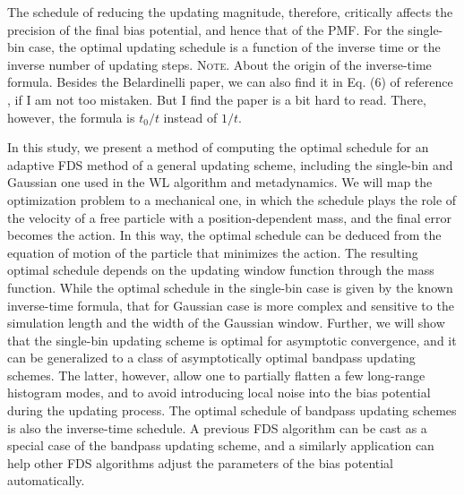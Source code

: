 \documentclass[reprint, superscriptaddress, floatfix]{revtex4-1}
\newcommand{\note}[1]{{\color{DarkGreen}\footnotesize \textsc{Note.} #1}}
\begin{document}
The schedule of reducing
the updating magnitude,
therefore, critically affects
the precision of the final bias potential,
and hence that of the PMF\cite{laio2005, bussi2006, poulain2006,
belardinelli2007, *belardinelli2007jcp, *belardinelli2008, *belardinelli2016,
liang2007, min2007,
morozov2007, zhou2008,
komura2012, *caparica2012, *caparica2014,
barducci2008, dickson2011, dama2014}.
%
For the single-bin case, the optimal updating schedule
is a function of the
inverse time\cite{
belardinelli2007, *belardinelli2007jcp, *belardinelli2008, *belardinelli2016,
liang2007,
morozov2007, zhou2008}
or
the inverse number of updating steps.
\note{
  About the origin of the inverse-time formula.
  Besides the Belardinelli paper,
  we can also find it in Eq. (6) of reference \cite{liang2007},
  if I am not too mistaken.
  But I find the paper is a bit hard to read.
  There, however, the formula is $t_0/t$ instead of $1/t$.
}
%


In this study,
we present a method of computing
the optimal schedule
for an adaptive FDS method
of a general updating scheme,
including the single-bin and Gaussian one
used in the WL algorithm and metadynamics.
%
We will map the optimization problem to a mechanical one,
in which the schedule plays the role of the velocity of
a free particle with a position-dependent mass,
and the final error becomes the action.
%
In this way, the optimal schedule
can be deduced from the equation of motion
of the particle that minimizes the action.
%
The resulting optimal schedule
depends on the updating window function
through the mass function.
%
While the optimal schedule in the single-bin case
is given by the known inverse-time formula,
that for Gaussian case is more complex
and sensitive to the simulation length
and the width of the Gaussian window.
%
%
Further, we will show that
the single-bin updating scheme
is optimal for asymptotic convergence,
and it can be generalized
to a class of asymptotically optimal
bandpass updating schemes.
%
The latter, however,
allow one to partially flatten
a few long-range histogram modes,
and to avoid introducing local noise
into the bias potential during the updating process.
%
The optimal schedule of bandpass updating schemes
is also the inverse-time schedule.
%
A previous FDS algorithm\cite{langfeld2012, pellegrini2014}
can be cast as a special case of the bandpass updating scheme,
and a similarly application can help other FDS
algorithms\cite{neuhaus2006, *neuhaus2007, zhu2012}
adjust the parameters of the bias potential automatically.
\end{document}
